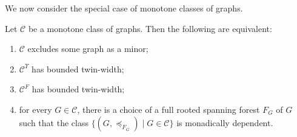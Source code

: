 \documentclass[1p,number,11pt]{elsarticle}
\theoremstyle{plain}
\newcommand{\Cc}{\mathscr{C}}
\begin{document}
\bigskip
We now consider the special case of monotone classes of graphs.
\begin{theorem}[store=thm-main-monotone]
Let $\Cc$ be a monotone class of graphs. Then the following are equivalent:
\begin{enumerate}[nosep]
    \item $\Cc$ excludes some graph as a minor;
    \item $\Cc^{\Upsilon}$ has bounded twin-width;
    \item $\Cc^F$ has bounded twin-width;
    \item for every $G\in\Cc$, there is a choice of a full rooted spanning forest $F_G$ of $G$
     such that the class
    $\{(G,\preceq_{F_G})\mid G\in\Cc\}$ is monadically dependent.
\end{enumerate}
\end{theorem}
\end{document}
